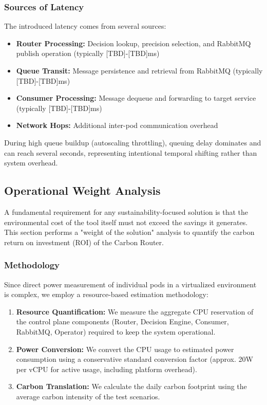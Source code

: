 \subsubsection{Sources of Latency}

The introduced latency comes from several sources:

\begin{itemize}
    \item \textbf{Router Processing:} Decision lookup, precision selection, and RabbitMQ publish operation (typically [TBD]-[TBD]ms)
    \item \textbf{Queue Transit:} Message persistence and retrieval from RabbitMQ (typically [TBD]-[TBD]ms)
    \item \textbf{Consumer Processing:} Message dequeue and forwarding to target service (typically [TBD]-[TBD]ms)
    \item \textbf{Network Hops:} Additional inter-pod communication overhead
\end{itemize}

During high queue buildup (autoscaling throttling), queuing delay dominates and can reach several seconds, representing intentional temporal shifting rather than system overhead.

\subsection{Operational Weight Analysis}

A fundamental requirement for any sustainability-focused solution is that the environmental cost of the tool itself must not exceed the savings it generates. This section performs a "weight of the solution" analysis to quantify the carbon return on investment (ROI) of the Carbon Router.

\subsubsection{Methodology}

Since direct power measurement of individual pods in a virtualized environment is complex, we employ a resource-based estimation methodology:

\begin{enumerate}
    \item \textbf{Resource Quantification:} We measure the aggregate CPU reservation of the control plane components (Router, Decision Engine, Consumer, RabbitMQ, Operator) required to keep the system operational.
    \item \textbf{Power Conversion:} We convert the CPU usage to estimated power consumption using a conservative standard conversion factor (approx. 20W per vCPU for active usage, including platform overhead).
    \item \textbf{Carbon Translation:} We calculate the daily carbon footprint using the average carbon intensity of the test scenarios.
\end{enumerate}


